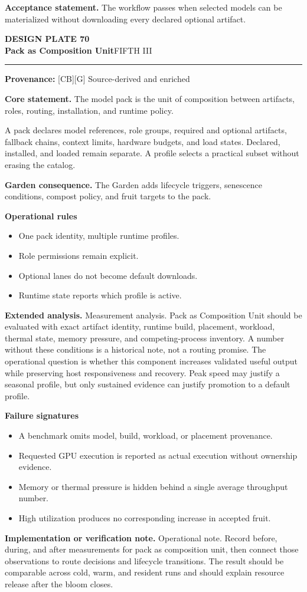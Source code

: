\documentclass[10pt,letterpaper,oneside]{article}
\newcommand{\prov}[1]{\textcolor{gardenBlue}{\sffamily\footnotesize\textbf{Provenance:} #1}}
\newcommand{\platetitle}[3]{%
  \begin{minipage}[t][0.54in][t]{\textwidth}
  {\sffamily\bfseries\color{gardenDeep}\fontsize{9}{10}\selectfont DESIGN PLATE #1}\\[-1pt]
  {\sffamily\bfseries\color{gardenInk}\fontsize{16.5}{18}\selectfont #2}\hfill{\sffamily\color{gardenGreen}\large #3}
  \end{minipage}\vspace{-2pt}\hrule\vspace{5pt}}
\begin{document}
\begin{acceptbox}
\textbf{Acceptance statement.} The workflow passes when selected models can be materialized without downloading every declared optional artifact.
\end{acceptbox}
\newpage
\platetitle{70}{Pack as Composition Unit}{FIFTH III}
\prov{[CB][G] Source-derived and enriched}
\fontsize{8.85}{10.45}\selectfont
\begin{corebox}
\textbf{Core statement.} The model pack is the unit of composition between artifacts, roles, routing, installation, and runtime policy.
\end{corebox}
A pack declares model references, role groups, required and optional artifacts, fallback chains, context limits, hardware budgets, and load states. Declared, installed, and loaded remain separate. A profile selects a practical subset without erasing the catalog.

\textbf{Garden consequence.} The Garden adds lifecycle triggers, senescence conditions, compost policy, and fruit targets to the pack.

\textbf{Operational rules}
\begin{itemize}
\item One pack identity, multiple runtime profiles.
\item Role permissions remain explicit.
\item Optional lanes do not become default downloads.
\item Runtime state reports which profile is active.
\end{itemize}
\textbf{Extended analysis.} Measurement analysis. Pack as Composition Unit should be evaluated with exact artifact identity, runtime build, placement, workload, thermal state, memory pressure, and competing-process inventory. A number without these conditions is a historical note, not a routing promise. The operational question is whether this component increases validated useful output while preserving host responsiveness and recovery. Peak speed may justify a seasonal profile, but only sustained evidence can justify promotion to a default profile.

\textbf{Failure signatures}
\begin{itemize}
\item A benchmark omits model, build, workload, or placement provenance.
\item Requested GPU execution is reported as actual execution without ownership evidence.
\item Memory or thermal pressure is hidden behind a single average throughput number.
\item High utilization produces no corresponding increase in accepted fruit.
\end{itemize}
\textbf{Implementation or verification note.} Operational note. Record before, during, and after measurements for pack as composition unit, then connect those observations to route decisions and lifecycle transitions. The result should be comparable across cold, warm, and resident runs and should explain resource release after the bloom closes.
\end{document}
